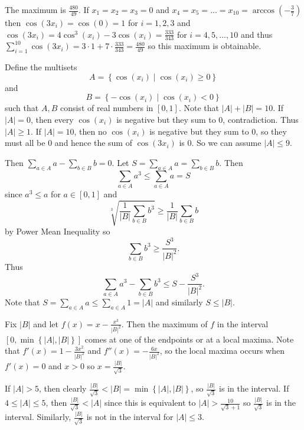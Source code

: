 The maximum is $\boxed{\frac{480}{49}}$. If $x_1=x_2=x_3=0$ and $x_4=x_5=\ldots=x_{10}=\arccos\left(-\frac{3}{7}\right)$ then $\cos\left(3x_i\right)=\cos\left(0\right)=1$ for $i=1,2,3$ and $\cos\left(3x_i\right)=4\cos^3\left(x_i\right)-3\cos\left(x_i\right)=\frac{333}{343}$ for $i=4,5,\ldots,10$ and thus $\displaystyle\sum_{i=1}^{10}\cos\left(3x_i\right)=3\cdot1+7\cdot\frac{333}{343}=\frac{480}{49}$ so this maximum is obtainable.

Define the multisets \[A=\left\{\cos\left(x_i\right)\mid\cos\left(x_i\right)\geq0\right\}\] and \[B=\left\{-\cos\left(x_i\right)\mid\cos\left(x_i\right)<0\right\}\] such that $A,B$ consist of real numbers in $\left[0,1\right]$. Note that $\left|A\right|+\left|B\right|=10$. If $\left|A\right|=0$, then every $\cos\left(x_i\right)$ is negative but they sum to $0$, contradiction. Thus $\left|A\right|\geq1$. If $\left|A\right|=10$, then no $\cos\left(x_i\right)$ is negative but they sum to $0$, so they must all be $0$ and hence the sum of $\cos\left(3x_i\right)$ is $0$. So we can assume $\left|A\right|\leq9$.

Then $\displaystyle\sum_{a\in A}a-\displaystyle\sum_{b\in B}b=0$. Let $S=\displaystyle\sum_{a\in A}a=\displaystyle\sum_{b\in B}b$. Then \[\displaystyle\sum_{a\in A}a^3\leq\displaystyle\sum_{a\in A}a=S\] since $a^3\leq a$ for $a\in\left[0,1\right]$ and \[\sqrt[3]{\frac{1}{\left|B\right|}\displaystyle\sum_{b\in B}b^3}\geq\frac{1}{\left|B\right|}\displaystyle\sum_{b\in B}b\] by Power Mean Inequality so \[\displaystyle\sum_{b\in B}b^3\geq\frac{S^3}{\left|B\right|^2}.\] Thus \[\displaystyle\sum_{a\in A}a^3-\displaystyle\sum_{b\in B}b^3\leq S-\frac{S^3}{\left|B\right|^2}.\] Note that $S=\displaystyle\sum_{a\in A}a\leq\displaystyle\sum_{a\in A}1=\left|A\right|$ and similarly $S\leq\left|B\right|$.

Fix $\left|B\right|$ and let $f\left(x\right)=x-\frac{x^3}{\left|B\right|^2}$. Then the maximum of $f$ in the interval $\left[0,\min\left\{\left|A\right|,\left|B\right|\right\}\right]$ comes at one of the endpoints or at a local maxima. Note that $f'\left(x\right)=1-\frac{3x^2}{\left|B\right|^2}$ and $f''\left(x\right)=-\frac{6x}{\left|B\right|^2}$, so the local maxima occurs when $f'\left(x\right)=0$ and $x>0$ so $x=\frac{\left|B\right|}{\sqrt{3}}$.

If $\left|A\right|>5$, then clearly $\frac{\left|B\right|}{\sqrt{3}}<\left|B\right|=\min\left\{\left|A\right|,\left|B\right|\right\}$, so $\frac{\left|B\right|}{\sqrt{3}}$ is in the interval. If $4\leq\left|A\right|\leq5$, then $\frac{\left|B\right|}{\sqrt{3}}<\left|A\right|$ since this is equivalent to $\left|A\right|>\frac{10}{\sqrt{3}+1}$ so $\frac{\left|B\right|}{\sqrt{3}}$ is in the interval. Similarly, $\frac{\left|B\right|}{\sqrt{3}}$ is not in the interval for $\left|A\right|\leq3$.

